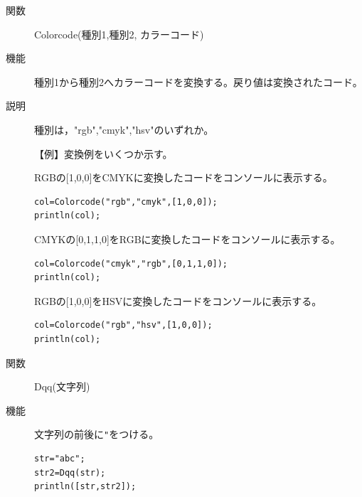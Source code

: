 \documentclass[papersize,a4paper,10pt,uplatex]{jsarticle}
\begin{document}
\begin{description}

\hypertarget{colorcode}{}
\item[関数]Colorcode(種別1,種別2, カラーコード)
\item[機能]種別1から種別2へカラーコードを変換する。戻り値は変換されたコード。
\item[説明]種別は，"rgb","cmyk","hsv"のいずれか。

\vspace{\baselineskip}
【例】変換例をいくつか示す。

RGBの[1,0,0]をCMYKに変換したコードをコンソールに表示する。
\begin{verbatim}
col=Colorcode("rgb","cmyk",[1,0,0]); 
println(col); 
\end{verbatim}

CMYKの[0,1,1,0]をRGBに変換したコードをコンソールに表示する。

\begin{verbatim}
col=Colorcode("cmyk","rgb",[0,1,1,0]);
println(col); 
\end{verbatim}

RGBの[1,0,0]をHSVに変換したコードをコンソールに表示する。

\begin{verbatim}
col=Colorcode("rgb","hsv",[1,0,0]);
println(col); 
\end{verbatim}

\vspace{\baselineskip}
\hypertarget{dqq}{}
\item[関数]Dqq(文字列)
\item[機能]文字列の前後に\verb|"|をつける。
\begin{verbatim}
str="abc";
str2=Dqq(str);
println([str,str2]); 
\end{verbatim}


\end{description}
\end{document}
